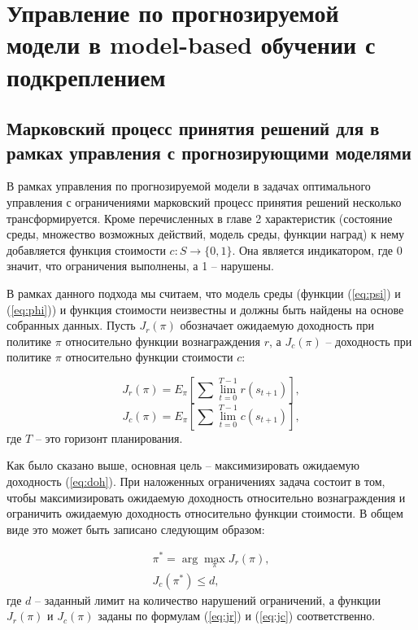 \chapter{Управление по прогнозируемой модели в model-based обучении с подкреплением}\label{chap4}

\section{Марковский процесс принятия решений для в рамках управления с прогнозирующими моделями}\label{1sec:optimal-control}


В рамках управления по прогнозируемой модели в задачах оптимального управления с ограничениями марковский процесс принятия решений несколько трансформируется. Кроме перечисленных в главе 2 характеристик (состояние среды, множество возможных действий, модель среды, функции наград) к нему добавляется функция стоимости $c: S \to \{0, 1\}$. Она является индикатором, где 0 значит, что ограничения выполнены, а 1 -- нарушены. 

В рамках данного подхода мы считаем, что модель среды (функции (\ref{eq:psi}) и (\ref{eq:phi})) и функция стоимости неизвестны и должны быть найдены на основе собранных данных. Пусть $J_r (\pi)$ обозначает ожидаемую доходность при политике $\pi$ относительно функции вознаграждения $r$, а $J_c (\pi)$ -- доходность при политике $\pi$ относительно функции стоимости $c$:

\begin{equation}
	J_r(\pi) = E_{\pi}[\sum\lim_{t=0}^{T-1} r(s_{t+1})],
	\label{eq:jr}
\end{equation}
\begin{equation}
    J_c(\pi) = E_{\pi}[\sum\lim_{t=0}^{T-1} c(s_{t+1})],
    \label{eq:jc}
\end{equation}
где $T$ -- это горизонт планирования. 

Как было сказано выше, основная цель -- максимизировать ожидаемую доходность (\ref{eq:doh}). При наложенных ограничениях задача состоит в том, чтобы максимизировать ожидаемую доходность  относительно вознаграждения и ограничить ожидаемую доходность относительно функции стоимости. В общем виде это может быть записано следующим образом:

\begin{equation}
	\begin{split}
		\pi^* = \arg \max_{\pi} J_r(\pi), \\
		J_c(\pi^*) \leq d,
	\label{eq:task3}
	\end{split}
\end{equation}
где $d$ -- заданный лимит на количество нарушений ограничений, а функции $J_r(\pi)$ и $J_c(\pi)$ заданы по формулам (\ref{eq:jr}) и (\ref{eq:jc}) соответственно. 


